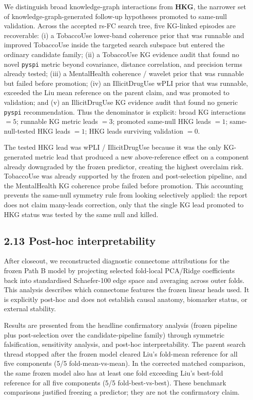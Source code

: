 \documentclass[11pt,letterpaper]{report}
\begin{document}
We distinguish broad knowledge-graph interactions from \textbf{HKG}, the narrower set of knowledge-graph-generated follow-up hypotheses promoted to same-null validation. Across the accepted rs-FC search tree, five KG-linked episodes are recoverable: (i) a TobaccoUse lower-band coherence prior that was runnable and improved TobaccoUse inside the targeted search subspace but entered the ordinary candidate family; (ii) a TobaccoUse KG evidence audit that found no novel \texttt{pyspi} metric beyond covariance, distance correlation, and precision terms already tested; (iii) a MentalHealth coherence / wavelet prior that was runnable but failed before promotion; (iv) an IllicitDrugUse wPLI prior that was runnable, exceeded the Liu mean reference on the parent claim, and was promoted to validation; and (v) an IllicitDrugUse KG evidence audit that found no generic \texttt{pyspi} recommendation. Thus the denominator is explicit: broad KG interactions $= 5$; runnable KG metric leads $= 3$; promoted same-null HKG leads $= 1$; same-null-tested HKG leads $= 1$; HKG leads surviving validation $= 0$.

The tested HKG lead was wPLI / IllicitDrugUse because it was the only KG-generated metric lead that produced a new above-reference effect on a component already downgraded by the frozen predictor, creating the highest overclaim risk. TobaccoUse was already supported by the frozen and post-selection pipeline, and the MentalHealth KG coherence probe failed before promotion. This accounting prevents the same-null symmetry rule from looking selectively applied: the report does not claim many-leads correction, only that the single KG lead promoted to HKG status was tested by the same null and killed.

\subsection*{2.13 Post-hoc interpretability}

After closeout, we reconstructed diagnostic connectome attributions for the frozen Path B model by projecting selected fold-local PCA/Ridge coefficients back into standardised Schaefer-100 edge space and averaging across outer folds. This analysis describes which connectome features the frozen linear heads used. It is explicitly post-hoc and does not establish causal anatomy, biomarker status, or external stability.



Results are presented from the headline confirmatory analysis (frozen pipeline plus post-selection over the candidate-pipeline family) through symmetric falsification, sensitivity analysis, and post-hoc interpretability. The parent search thread stopped after the frozen model cleared Liu's fold-mean reference for all five components (5/5 fold-mean-vs-mean). In the corrected matched comparison, the same frozen model also has at least one fold exceeding Liu's best-fold reference for all five components (5/5 fold-best-vs-best). These benchmark comparisons justified freezing a predictor; they are not the confirmatory claim.
\end{document}
